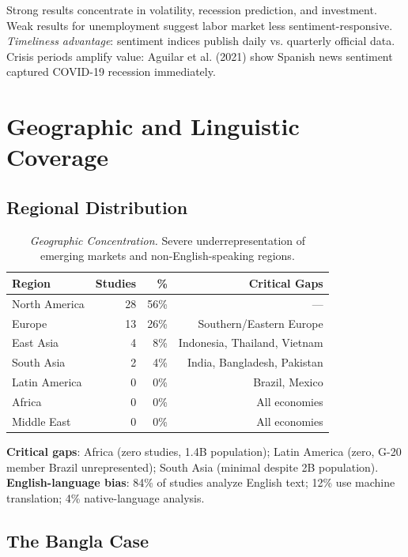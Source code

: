 \documentclass[11pt]{article}
\begin{document}
Strong results concentrate in volatility, recession prediction, and investment. Weak results for unemployment suggest labor market less sentiment-responsive. \textit{Timeliness advantage}: sentiment indices publish daily vs. quarterly official data. Crisis periods amplify value: Aguilar et al. (2021) show Spanish news sentiment captured COVID-19 recession immediately.

\section{Geographic and Linguistic Coverage}

\subsection{Regional Distribution}

\begin{table}[H]
\centering \small
\begin{tabular}{lrrr}
\toprule
\textbf{Region} & \textbf{Studies} & \textbf{\%} & \textbf{Critical Gaps} \\
\midrule
North America & 28 & 56\% & — \\
Europe & 13 & 26\% & Southern/Eastern Europe \\
East Asia & 4 & 8\% & Indonesia, Thailand, Vietnam \\
South Asia & 2 & 4\% & India, Bangladesh, Pakistan \\
Latin America & 0 & 0\% & Brazil, Mexico \\
Africa & 0 & 0\% & All economies \\
Middle East & 0 & 0\% & All economies \\
\bottomrule
\end{tabular}
\caption{\textit{Geographic Concentration.} Severe underrepresentation of emerging markets and non-English-speaking regions.}
\end{table}

\textbf{Critical gaps}: Africa (zero studies, 1.4B population); Latin America (zero, G-20 member Brazil unrepresented); South Asia (minimal despite 2B population). \textbf{English-language bias}: 84\% of studies analyze English text; 12\% use machine translation; 4\% native-language analysis.

\subsection{The Bangla Case}
\end{document}
